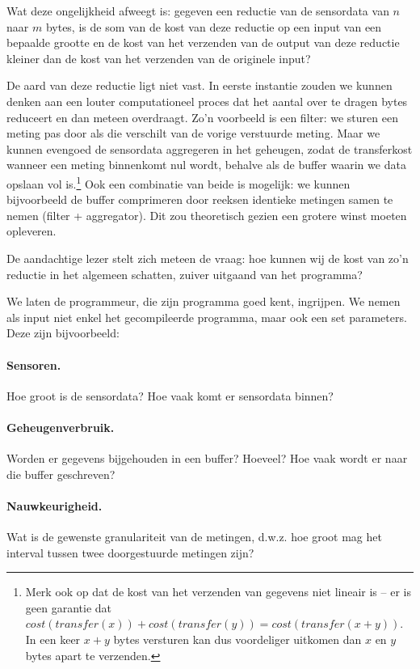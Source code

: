 \documentclass{article}
\begin{document}
Wat deze ongelijkheid afweegt is: gegeven een reductie van de sensordata van $n$ naar
$m$ bytes, is de som van de kost van deze reductie op een input van een bepaalde
grootte en de kost van het verzenden van de output van deze reductie kleiner dan
de kost van het verzenden van de originele input?

De aard van deze reductie ligt niet vast. In eerste instantie zouden we kunnen
denken aan een louter computationeel proces dat het aantal over te dragen bytes
reduceert en dan meteen overdraagt. Zo'n voorbeeld is een filter: we sturen een
meting pas door als die verschilt van de vorige verstuurde meting. Maar we
kunnen evengoed de sensordata aggregeren in het geheugen, zodat de transferkost
wanneer een meting binnenkomt nul wordt, behalve als de buffer waarin we data
opslaan vol is.\footnote{Merk ook op dat de kost van het verzenden van gegevens
niet lineair is -- er is geen garantie dat $cost(transfer(x)) +
cost(transfer(y)) = cost(transfer(x + y))$. In een keer $x + y$ bytes versturen
kan dus voordeliger uitkomen dan $x$ en $y$ bytes apart te verzenden.} 
Ook een combinatie van beide is mogelijk: we kunnen bijvoorbeeld de buffer
comprimeren door reeksen identieke metingen samen te nemen (filter +
aggregator). Dit zou theoretisch gezien een grotere winst moeten opleveren.

De aandachtige lezer stelt zich meteen de vraag: hoe kunnen wij de kost van zo'n
reductie in het algemeen schatten, zuiver uitgaand van het programma? 


We laten de programmeur, die zijn programma goed kent, ingrijpen. We nemen als
input niet enkel het gecompileerde programma, maar ook een set parameters. Deze zijn bijvoorbeeld:

\paragraph{Sensoren.} Hoe groot is de sensordata? Hoe vaak komt er sensordata binnen?
\paragraph{Geheugenverbruik.} Worden er gegevens bijgehouden in een buffer? Hoeveel? Hoe vaak wordt er naar die buffer geschreven?
\paragraph{Nauwkeurigheid.} Wat is de gewenste granulariteit van de metingen,
d.w.z. hoe groot mag het interval tussen twee doorgestuurde metingen zijn?
\end{document}
